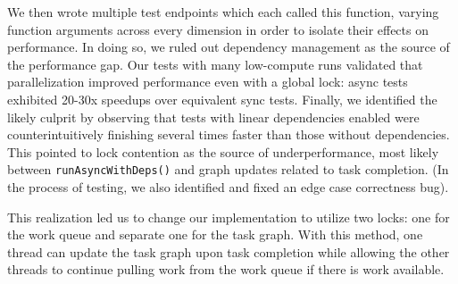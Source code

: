\documentclass[11pt]{article}
\begin{document}
\medskip
We then wrote multiple test endpoints which each called this function, varying
function arguments across every dimension in order to isolate their effects on
performance. In doing so, we ruled out dependency management as the source of
the performance gap. Our tests with many low-compute runs validated that
parallelization improved performance even with a global lock: async tests
exhibited 20-30x speedups over equivalent sync tests. Finally, we identified the
likely culprit by observing that tests with linear dependencies enabled were
counterintuitively finishing several times faster than those without
dependencies. This pointed to lock contention as the source of underperformance,
most likely between \verb|runAsyncWithDeps()| and graph updates related to task
completion. (In the process of testing, we also identified and fixed an edge
case correctness bug).

\medskip
This realization led us to change our implementation to utilize two locks: one
for the work queue and separate one for the task graph. With this method, one
thread can update the task graph upon task completion while allowing the
other threads to continue pulling work from the work queue if there is work
available.
\end{document}
